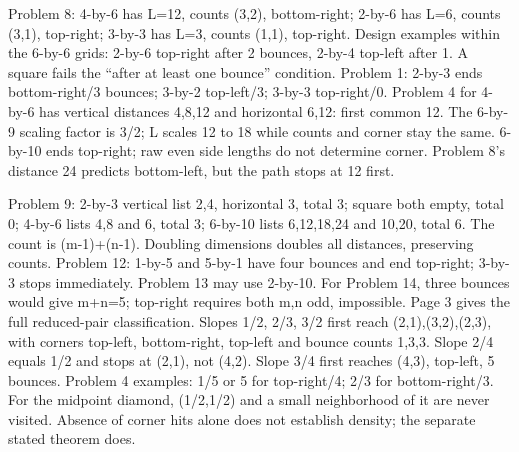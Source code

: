 \documentclass[11pt]{article}
\begin{document}
Problem 8: 4-by-6 has L=12, counts (3,2), bottom-right; 2-by-6 has L=6, counts (3,1), top-right; 3-by-3 has L=3, counts (1,1), top-right. Design examples within the 6-by-6 grids: 2-by-6 top-right after 2 bounces, 2-by-4 top-left after 1. A square fails the ``after at least one bounce'' condition.
Problem 1: 2-by-3 ends bottom-right/3 bounces; 3-by-2 top-left/3; 3-by-3 top-right/0. Problem 4 for 4-by-6 has vertical distances 4,8,12 and horizontal 6,12: first common 12. The 6-by-9 scaling factor is 3/2; L scales 12 to 18 while counts and corner stay the same. 6-by-10 ends top-right; raw even side lengths do not determine corner. Problem 8's distance 24 predicts bottom-left, but the path stops at 12 first.

Problem 9: 2-by-3 vertical list 2,4, horizontal 3, total 3; square both empty, total 0; 4-by-6 lists 4,8 and 6, total 3; 6-by-10 lists 6,12,18,24 and 10,20, total 6. The count is (m-1)+(n-1). Doubling dimensions doubles all distances, preserving counts. Problem 12: 1-by-5 and 5-by-1 have four bounces and end top-right; 3-by-3 stops immediately. Problem 13 may use 2-by-10. For Problem 14, three bounces would give m+n=5; top-right requires both m,n odd, impossible. Page 3 gives the full reduced-pair classification.
Slopes 1/2, 2/3, 3/2 first reach (2,1),(3,2),(2,3), with corners top-left, bottom-right, top-left and bounce counts 1,3,3. Slope 2/4 equals 1/2 and stops at (2,1), not (4,2). Slope 3/4 first reaches (4,3), top-left, 5 bounces. Problem 4 examples: 1/5 or 5 for top-right/4; 2/3 for bottom-right/3. For the midpoint diamond, (1/2,1/2) and a small neighborhood of it are never visited. Absence of corner hits alone does not establish density; the separate stated theorem does.
\end{document}
